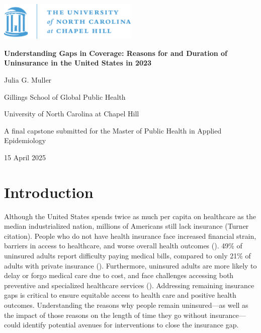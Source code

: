 \documentclass[12pt]{article}
\newcommand{\documentgeometry}{\newgeometry{top=1in, bottom=1in, left=1in, right=1in}}
\begin{document}
\begin{titlepage}
    \centering
    \vspace*{-3cm}
    \includegraphics[width=0.5\textwidth]{reports/unc-logo.png}\par
    \vspace{0.5cm}
    {\Huge\bfseries Understanding Gaps in Coverage: Reasons for and Duration of Uninsurance in the United States in 2023 \par}
    \vspace{2cm}
    {\LARGE Julia G. Muller\par}
    {\Large Gillings School of Global Public Health \par}
    {\Large University of North Carolina at Chapel Hill \par}
    \vspace{3cm}
    {\large A final capstone submitted for the Master of Public Health in Applied Epidemiology \par}
    \vspace{1cm}
    {\large 15 April 2025\par}
    \vspace{1cm}
\end{titlepage}


\newpage
\documentgeometry
\tableofcontents


\newpage
\section{Introduction}

Although the United States spends twice as much per capita on healthcare as the median industrialized nation, millions of Americans still lack insurance (Turner citation). People who do not have health insurance face increased financial strain, barriers in access to healthcare, and worse overall health outcomes (\cite{davis_uninsured_2007}). 49\% of uninsured adults report difficulty paying medical bills, compared to only 21\% of adults with private insurance (\cite{tolbert_key_2024}). Furthermore, uninsured adults are more likely to delay or forgo medical care due to cost, and face challenges accessing both preventive and specialized healthcare services (\cite{cha_reasons_2020, erly_characterization_2022}). Addressing remaining insurance gaps is critical to ensure equitable access to health care and positive health outcomes. Understanding the reasons why people remain uninsured—as well as the impact of those reasons on the length of time they go without insurance—could identify potential avenues for interventions to close the insurance gap.
\end{document}
